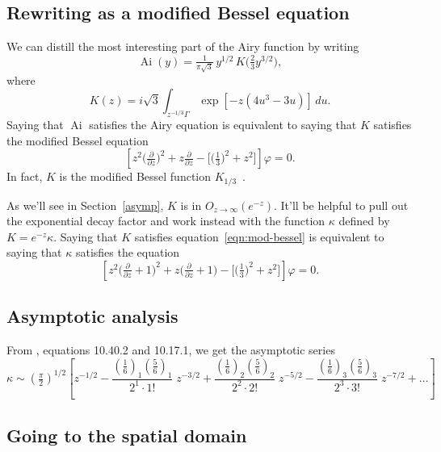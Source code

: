 \documentclass{article}
\DeclareMathOperator{\Ai}{Ai}
\begin{document}
\subsection{Rewriting as a modified Bessel equation}
We can distill the most interesting part of the Airy function by writing
\[ \Ai(y) = \tfrac{1}{\pi\sqrt{3}}\,y^{1/2}\,K\big(\tfrac{2}{3} y^{3/2}\big), \]
where
\begin{equation}\label{integral:mod-bessel}
K(z) = i\sqrt{3} \int_{z^{-1/3}\Gamma} \exp\left[-z \left(4u^3 - 3u\right)\right]\,du.
\end{equation}
Saying that $\Ai$ satisfies the Airy equation is equivalent to saying that $K$ satisfies the modified Bessel equation
\begin{equation}\label{eqn:mod-bessel}
\left[z^2 \big(\tfrac{\partial}{\partial z}\big)^2 + z \tfrac{\partial}{\partial z} - \big[\big(\tfrac{1}{3}\big)^2 + z^2\big]\right] \varphi = 0.
\end{equation}
In fact, $K$ is the modified Bessel function $K_{1/3}$~\cite[equation~9.6.1]{dlmf}.

As we'll see in Section~\ref{asymp}, $K$ is in $O_{z \to \infty}(e^{-z})$. It'll be helpful to pull out the exponential decay factor and work instead with the function $\kappa$ defined by $K = e^{-z} \kappa$. Saying that $K$ satisfies equation~\ref{eqn:mod-bessel} is equivalent to saying that $\kappa$ satisfies the equation
\begin{equation}\label{eqn:shifted-mod-bessel}
\left[z^2 \big(\tfrac{\partial}{\partial z} + 1\big)^2 + z \big(\tfrac{\partial}{\partial z} + 1\big) - \big[\big(\tfrac{1}{3}\big)^2 + z^2\big]\right] \varphi = 0.
\end{equation}
\subsection{Asymptotic analysis}
From \cite{dlmf}, equations 10.40.2 and 10.17.1, we get the asymptotic series
\begin{equation}\label{bessel-asymp}
\kappa \sim \left(\tfrac{\pi}{2}\right)^{1/2} \left[ z^{-1/2} - \frac{(\tfrac{1}{6})_1 (\tfrac{5}{6})_1}{2^1 \cdot 1!}\;z^{-3/2} + \frac{(\tfrac{1}{6})_2 (\tfrac{5}{6})_2}{2^2 \cdot 2!}\;z^{-5/2} - \frac{(\tfrac{1}{6})_3 (\tfrac{5}{6})_3}{2^3 \cdot 3!}\;z^{-7/2} + \ldots \right]
\end{equation}
\subsection{Going to the spatial domain}\label{spatial}
\end{document}
